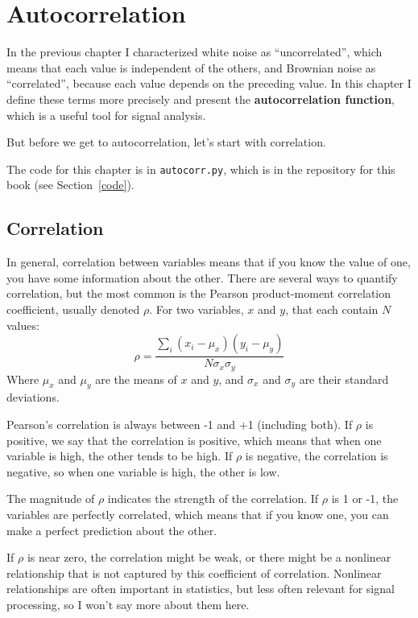 \documentclass[12pt]{book}
\begin{document}
\chapter{Autocorrelation}

In the previous chapter I characterized white noise as ``uncorrelated'',
which means that each value is independent of the others, and Brownian
noise as ``correlated'', because each value depends on the preceding
value.  In this chapter I define these terms more precisely and
present the {\bf autocorrelation function}, which is a useful tool
for signal analysis.

But before we get to autocorrelation, let's start with correlation.

The code for this chapter is in {\tt autocorr.py}, which is in the
repository for this book (see Section~\ref{code}).


\section{Correlation}

In general, correlation between variables means that if you know the
value of one, you have some information about the other.  There are
several ways to quantify correlation, but the most common is the
Pearson product-moment correlation coefficient, usually denoted
$\rho$.  For two variables, $x$ and $y$, that each contain $N$ values:
%
\[ \rho = \frac{ \sum_i (x_i - \mu_x) (y_i - \mu_y)}{N \sigma_x \sigma_y} \]
%
Where $\mu_x$ and $\mu_y$ are the means of $x$ and $y$, and
$\sigma_x$ and $\sigma_y$ are their standard deviations.

Pearson's correlation is always between -1 and +1 (including both).
If $\rho$ is positive, we say that the correlation is positive,
which means that when one variable is high, the other tends to be
high.  If $\rho$ is negative, the correlation is negative, so
when one variable is high, the other is low.

The magnitude of $\rho$ indicates the strength of the correlation.  If
$\rho$ is 1 or -1, the variables are perfectly correlated, which means
that if you know one, you can make a perfect prediction about the
other.

If $\rho$ is near zero, the correlation might be weak, or there might
be a nonlinear relationship that is not captured by this coefficient
of correlation.  Nonlinear relationships are often important in
statistics, but less often relevant for signal processing, so I
won't say more about them here.
\end{document}
